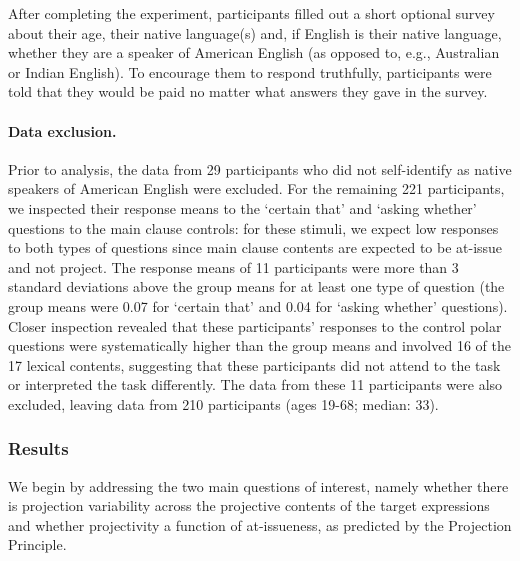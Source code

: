 \documentclass[11pt,fleqn]{article}
\newcommand{\6}{\mbox{$[\hspace*{-.6mm}[$}}
\newcommand{\9}{\mbox{$]\hspace*{-.6mm}]$}}
\begin{document}
After completing the experiment, participants filled out a short optional survey about their age, their native language(s) and, if English is their native language, whether they are a speaker of American English (as opposed to, e.g., Australian or Indian English). To encourage them to respond truthfully, participants were told that they would be paid no matter what answers they gave in the survey.

\paragraph{Data exclusion.}
Prior to analysis, the data from 29 participants who did not self-identify as native speakers of American English were excluded. For the remaining 221 participants, we inspected their response means to the `certain that' and `asking whether' questions 
to the main clause controls: for these stimuli, we expect low responses to both types of questions since main clause contents are expected to be at-issue and not project. The response means of 11 participants were more than 3 standard deviations above the group means for at least one type of question (the group means were 0.07 for `certain that' and 0.04 for `asking whether' questions). Closer inspection revealed that these participants' responses to the control polar questions were systematically higher than the group means and involved 16 of the 17 lexical contents, suggesting that these participants did not attend to the task or interpreted the task differently. The data from these 11 participants were also excluded, leaving data from 210 participants (ages 19-68; median: 33).  


\subsubsection{Results}

We begin by addressing the two main questions of interest, namely whether there is projection variability across the projective contents of the target expressions and whether projectivity a function of at-issueness, as predicted by the Projection Principle. 
\end{document}
